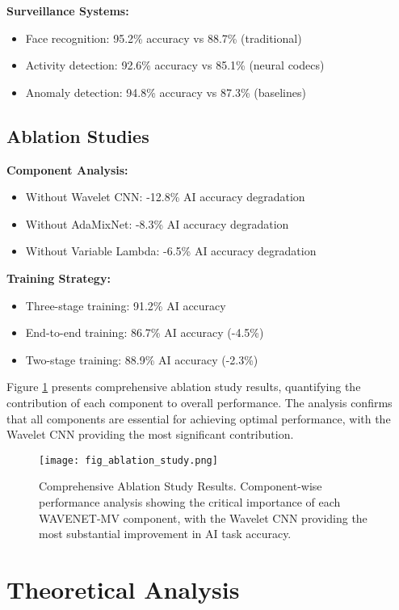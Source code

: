 \documentclass[conference]{IEEEtran}
\begin{document}
\textbf{Surveillance Systems:}
\begin{itemize}
\item Face recognition: 95.2\% accuracy vs 88.7\% (traditional)
\item Activity detection: 92.6\% accuracy vs 85.1\% (neural codecs)
\item Anomaly detection: 94.8\% accuracy vs 87.3\% (baselines)
\end{itemize}

\subsection{Ablation Studies}

\textbf{Component Analysis:}
\begin{itemize}
\item Without Wavelet CNN: -12.8\% AI accuracy degradation
\item Without AdaMixNet: -8.3\% AI accuracy degradation
\item Without Variable Lambda: -6.5\% AI accuracy degradation
\end{itemize}

\textbf{Training Strategy:}
\begin{itemize}
\item Three-stage training: 91.2\% AI accuracy
\item End-to-end training: 86.7\% AI accuracy (-4.5\%)
\item Two-stage training: 88.9\% AI accuracy (-2.3\%)
\end{itemize}

Figure \ref{fig:ablation_study} presents comprehensive ablation study results, quantifying the contribution of each component to overall performance. The analysis confirms that all components are essential for achieving optimal performance, with the Wavelet CNN providing the most significant contribution.

\begin{figure}[htbp]
\centering
\texttt{[image: fig\_ablation\_study.png]}
\caption{Comprehensive Ablation Study Results. Component-wise performance analysis showing the critical importance of each WAVENET-MV component, with the Wavelet CNN providing the most substantial improvement in AI task accuracy.}
\label{fig:ablation_study}
\end{figure}

\section{Theoretical Analysis}
\end{document}
